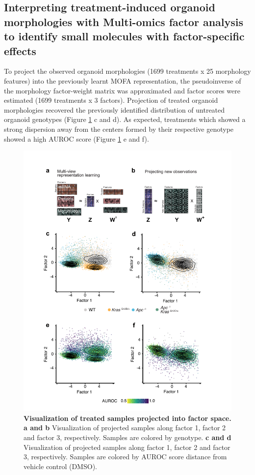 \begin{flushleft}
\newpage
\section{Interpreting treatment-induced organoid morphologies with Multi-omics factor analysis to identify small molecules with factor-specific effects}

To project the observed organoid morphologies (1699 treatments x 25 morphology features) into the previously learnt MOFA representation, the pseudoinverse of the morphology factor-weight matrix was approximated and factor scores were estimated (1699 treatments x 3 factors). Projection of treated organoid morphologies recovered the previously identified distribution of untreated organoid genotypes (Figure \ref{fig_500} c and d). As expected, treatments which showed a strong dispersion away from the centers formed by their respective genotype showed a high AUROC score (Figure \ref{fig_500} e and f).
\bigbreak

\begin{figure}[h]
\centering
\includegraphics[scale=0.75,
                keepaspectratio]{figures/adenomaprofiling/pdf/fig_5_0.pdf}
\caption[Visualization of treated samples projected into factor space]{\textbf{Visualization of treated samples projected into factor space. a and b} Visualization of projected samples along factor 1, factor 2 and factor 3, respectively. Samples are colored by genotype. \textbf{c and d} Visualization of projected samples along factor 1, factor 2 and factor 3, respectively. Samples are colored by AUROC score distance from vehicle control (DMSO).}
\label{fig_500}
\end{figure}
\bigbreak



\end{flushleft}
